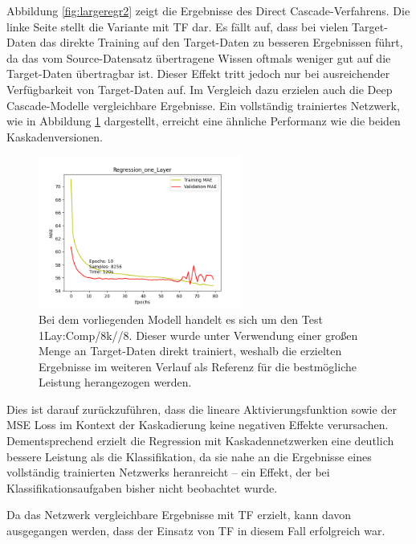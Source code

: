 Abbildung \ref{fig:largeregr2} zeigt die Ergebnisse des Direct Cascade-Verfahrens. Die linke Seite stellt die Variante mit TF dar. Es fällt auf, 
dass bei vielen Target-Daten das direkte Training auf den Target-Daten zu besseren Ergebnissen führt, da das vom Source-Datensatz 
übertragene Wissen oftmals weniger gut auf die Target-Daten übertragbar ist. Dieser Effekt tritt jedoch nur bei ausreichender Verfügbarkeit 
von Target-Daten auf. Im Vergleich dazu erzielen auch die Deep Cascade-Modelle vergleichbare Ergebnisse. Ein vollständig trainiertes Netzwerk, 
wie in Abbildung \ref{fig:largeregr2comp} dargestellt, erreicht eine ähnliche Performanz wie die beiden Kaskadenversionen.

\begin{figure}[htpb]
    \centering
    \includegraphics[height=5cm]{../../Plots/ba_plots/regression_large/onelayer_complete.png}
    \caption{\label{fig:largeregr2comp} 
    \small{Bei dem vorliegenden Modell handelt es sich um den Test 1Lay:Comp/8k//8. Dieser wurde unter Verwendung einer großen Menge an Target-Daten direkt 
    trainiert, weshalb die erzielten Ergebnisse im weiteren Verlauf als Referenz für die bestmögliche Leistung herangezogen werden.}}
\end{figure}

Dies ist darauf zurückzuführen, dass die lineare Aktivierungsfunktion sowie der MSE Loss im Kontext der Kaskadierung keine 
negativen Effekte verursachen. Dementsprechend erzielt die Regression mit Kaskadennetzwerken eine deutlich bessere Leistung als die 
Klassifikation, da sie nahe an die Ergebnisse eines vollständig trainierten Netzwerks heranreicht – ein Effekt, der bei Klassifikationsaufgaben 
bisher nicht beobachtet wurde.

Da das Netzwerk vergleichbare Ergebnisse mit TF erzielt, kann davon ausgegangen werden, dass der Einsatz von TF in diesem Fall 
erfolgreich war.
